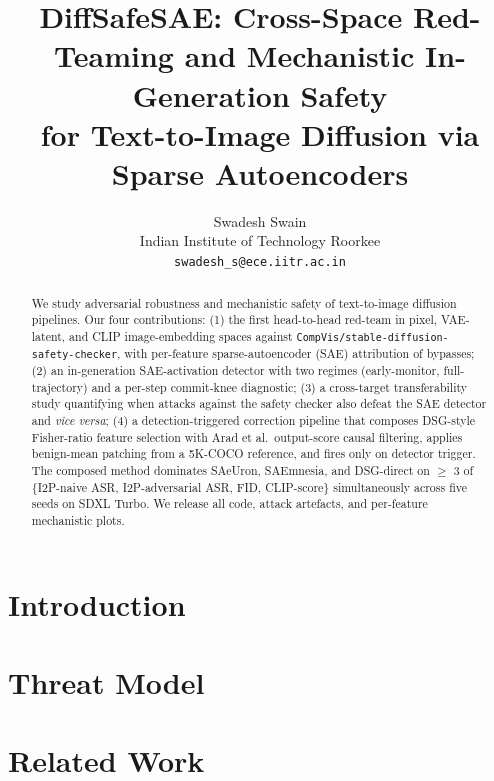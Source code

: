 \documentclass{article}
\title{DiffSafeSAE: Cross-Space Red-Teaming and Mechanistic In-Generation Safety \\
       for Text-to-Image Diffusion via Sparse Autoencoders}
\author{%
  Swadesh Swain \\
  Indian Institute of Technology Roorkee \\
  \texttt{swadesh\_s@ece.iitr.ac.in}
}
\begin{document}
\maketitle

\begin{abstract}
We study adversarial robustness and mechanistic safety of text-to-image diffusion pipelines.
Our four contributions: (1) the first head-to-head red-team in pixel, VAE-latent, and CLIP
image-embedding spaces against \texttt{CompVis/stable-diffusion-safety-checker}, with
per-feature sparse-autoencoder (SAE) attribution of bypasses; (2) an in-generation SAE-activation
detector with two regimes (early-monitor, full-trajectory) and a per-step commit-knee diagnostic;
(3) a cross-target transferability study quantifying when attacks against the safety checker
also defeat the SAE detector and \emph{vice versa}; (4) a detection-triggered correction pipeline
that composes DSG-style Fisher-ratio feature selection with Arad et al.\ output-score causal
filtering, applies benign-mean patching from a 5K-COCO reference, and fires only on detector
trigger. The composed method dominates SAeUron, SAEmnesia, and DSG-direct on \(\geq\) 3 of
\{I2P-naive ASR, I2P-adversarial ASR, FID, CLIP-score\} simultaneously across five seeds
on SDXL Turbo. We release all code, attack artefacts, and per-feature mechanistic plots.
\end{abstract}

\section{Introduction}
\label{sec:intro}

\section{Threat Model}
\label{sec:threat}

\section{Related Work}
\label{sec:related}
\end{document}
